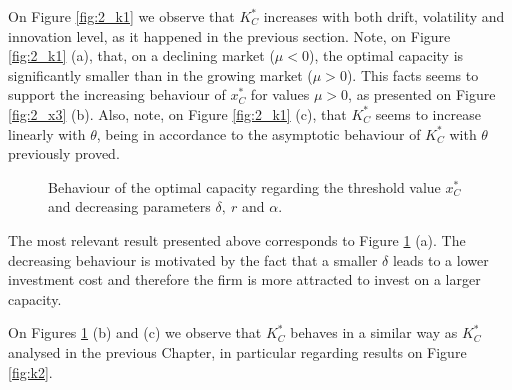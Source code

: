 On Figure \ref{fig:2_k1} we observe that $K^*_C$ increases with both drift, volatility and innovation level, as it happened in the previous section. 
Note, on Figure \ref{fig:2_k1} (a), that, on a declining market ($\mu<0$), the optimal capacity is significantly smaller than in the growing market ($\mu>0$). This facts seems to support the increasing behaviour of $x^*_C$ for values $\mu>0$, as presented on Figure \ref{fig:2_x3} (b).
Also, note, on Figure \ref{fig:2_k1} (c), that $K^*_C$ seems to increase linearly with $\theta$, being in accordance to the asymptotic behaviour of $K_C^*$ with $\theta$ previously proved.

\begin{figure}[!htb]
	\begin{subfigmatrix}{3}
	\end{subfigmatrix}
	\caption{Behaviour of the optimal capacity regarding the threshold value $x^*_C$ and decreasing parameters $\delta, \ r$ and $\alpha$.}
	\label{fig:2_k3}
\end{figure}

The most relevant result presented above corresponds to Figure \ref{fig:2_k3} (a). The decreasing behaviour is motivated by the fact that a smaller $\delta$ leads to a lower investment cost and therefore the firm is more attracted to invest on a larger capacity.

On Figures \ref{fig:2_k3} (b) and (c) we observe that $K^*_C$ behaves in a similar way as $K^*_C$ analysed in the previous Chapter, in particular regarding results on Figure \ref{fig:k2}.



